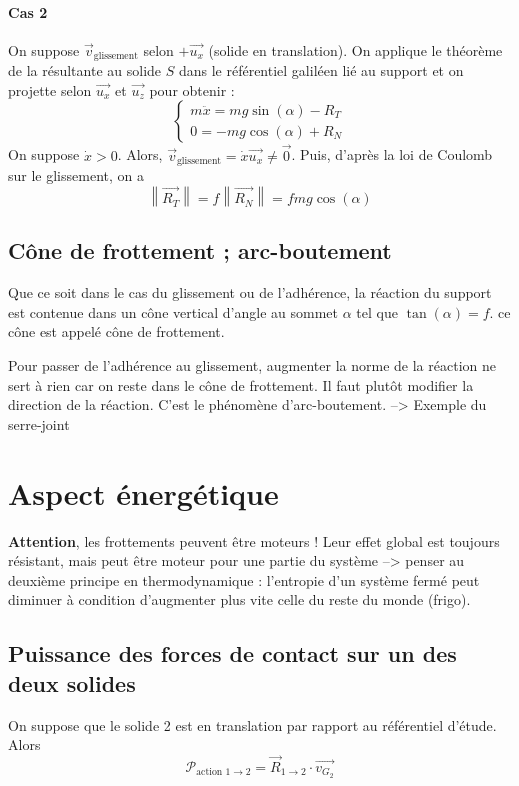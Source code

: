 \documentclass[french]{book}
\theoremstyle{plain}
\theoremstyle{definition}
\theoremstyle{remark}
\begin{document}
\paragraph{Cas 2} On suppose $\overrightarrow{v}_{\text{glissement}}$ selon $+\overrightarrow{u_x}$ (solide en translation). On applique le théorème de la résultante au solide $S$ dans le référentiel galiléen lié au support et on projette selon $\overrightarrow{u_x}$ et $\overrightarrow{u_z}$ pour obtenir : $$\begin{cases}
	m\ddot{x}=mg\sin(\alpha)-R_T \\
	0=-mg\cos(\alpha)+R_N
\end{cases}$$ On suppose $\dot{x}>0$. Alors, $\overrightarrow{v}_{\text{glissement}}=\dot{x}\overrightarrow{u_x}\ne\overrightarrow{0}$. Puis, d'après la loi de Coulomb sur le glissement, on a $$\left\lVert\overrightarrow{R_T}\right\rVert=f\left\lVert\overrightarrow{R_N}\right\rVert=fmg\cos(\alpha)$$
\subsection{Cône de frottement ; arc-boutement}
Que ce soit dans le cas du glissement ou de l'adhérence, la réaction du support est contenue dans un cône vertical d'angle au sommet $\alpha$ tel que $\tan(\alpha)=f$. ce cône est appelé cône de frottement. \\ \par Pour passer de l'adhérence au glissement, augmenter la norme de la réaction ne sert à rien car on reste dans le cône de frottement. Il faut plutôt modifier la direction de la réaction. C'est le phénomène d'arc-boutement. --> Exemple du serre-joint 
\section{Aspect énergétique}
\textbf{Attention}, les frottements peuvent être moteurs ! Leur effet global est toujours résistant, mais peut être moteur pour une partie du système --> penser au deuxième principe en thermodynamique : l'entropie d'un système fermé peut diminuer à condition d'augmenter plus vite celle du reste du monde (frigo).
\subsection{Puissance des forces de contact sur un des deux solides}
On suppose que le solide 2 est en translation par rapport au référentiel d'étude. Alors $$\mathcal{P}_{\text{action }1\to 2}=\overrightarrow{R}_{1\to 2}\cdot\overrightarrow{v_{G_2}}$$
\end{document}
